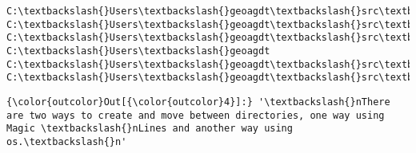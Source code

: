 \documentclass[11pt]{article}
\begin{document}
    \begin{Verbatim}[commandchars=\\\{\}]
C:\textbackslash{}Users\textbackslash{}geoagdt\textbackslash{}src\textbackslash{}python\textbackslash{}geog5990m\textbackslash{}src\textbackslash{}unpackaged\textbackslash{}abm\textbackslash{}AgentBasedModelling\textbackslash{}test
C:\textbackslash{}Users\textbackslash{}geoagdt\textbackslash{}src\textbackslash{}python\textbackslash{}geog5990m\textbackslash{}src\textbackslash{}unpackaged\textbackslash{}abm\textbackslash{}AgentBasedModelling
C:\textbackslash{}Users\textbackslash{}geoagdt\textbackslash{}src\textbackslash{}python\textbackslash{}geog5990m\textbackslash{}src\textbackslash{}unpackaged\textbackslash{}abm\textbackslash{}AgentBasedModelling
C:\textbackslash{}Users\textbackslash{}geoagdt
C:\textbackslash{}Users\textbackslash{}geoagdt\textbackslash{}src\textbackslash{}python\textbackslash{}geog5990m\textbackslash{}src\textbackslash{}unpackaged\textbackslash{}abm\textbackslash{}AgentBasedModelling\textbackslash{}test
C:\textbackslash{}Users\textbackslash{}geoagdt\textbackslash{}src\textbackslash{}python\textbackslash{}geog5990m\textbackslash{}src\textbackslash{}unpackaged\textbackslash{}abm\textbackslash{}AgentBasedModelling

    \end{Verbatim}

\begin{Verbatim}[commandchars=\\\{\}]
{\color{outcolor}Out[{\color{outcolor}4}]:} '\textbackslash{}nThere are two ways to create and move between directories, one way using Magic \textbackslash{}nLines and another way using os.\textbackslash{}n'
\end{Verbatim}
            

    
    
    
    
\end{document}
